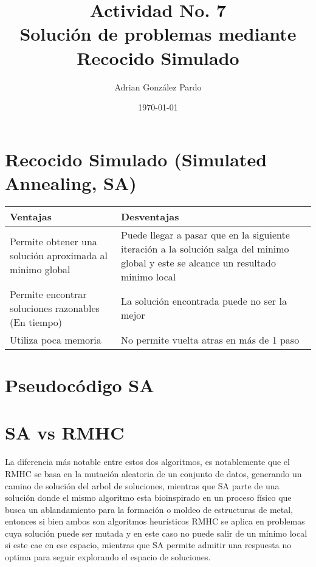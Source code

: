 \documentclass[10pt]{article}
\title{Actividad No. 7\\ Solución de problemas mediante Recocido Simulado}
\author{Adrian González Pardo}
\date{\today}
\begin{document}
\maketitle
\section{Recocido Simulado (Simulated Annealing, SA)}
\begin{center}
  \begin{tabular}{|p{6cm}|p{6cm}|}
    \hline
    Ventajas & Desventajas \\
    \hline
    Permite obtener una solución aproximada al minimo global & Puede llegar a pasar que en la siguiente iteración a la solución salga del minimo global y este se alcance un resultado minimo local \\
    \hline
    Permite encontrar soluciones razonables (En tiempo) & La solución encontrada puede no ser la mejor\\
    \hline
    Utiliza poca memoria & No permite vuelta atras en más de 1 paso\\
    \hline
  \end{tabular}
\end{center}
\section{Pseudocódigo SA}

\section{SA vs RMHC}
La diferencia más notable entre estos dos algoritmos, es notablemente que el RMHC se basa en la mutación aleatoria de un conjunto de datos, generando un camino de solución del arbol de soluciones, mientras que SA parte de una solución donde el mismo algoritmo esta bioinspirado en un proceso físico que busca un ablandamiento para la formación o moldeo de estructuras de metal, entonces si bien ambos son algoritmos heurísticos RMHC se aplica en problemas cuya solución puede ser mutada y en este caso no puede salir de un mínimo local si este cae en ese espacio, mientras que SA permite admitir una respuesta no optima para seguir explorando el espacio de soluciones.
\end{document}
